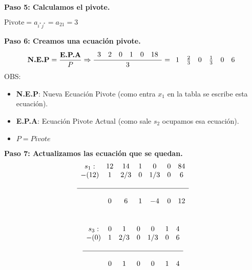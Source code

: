 \documentclass{templateNote}
\begin{document}
\textbf{Paso 5: Calculamos el pivote.}
\begin{center}
    $\text{Pivote} = a_{i^*j^*} = a_{21} = 3$
\end{center}

\textbf{Paso 6: Creamos una ecuación pivote.}
\begin{equation*}
    \textbf{N.E.P} = \frac{\textbf{E.P.A}}{P} \\
    \Rightarrow \frac{\begin{array}{cccccc} 3 & 2 & 0 & 1 & 0 & 18\end{array}}{3} = \begin{array}{cccccc} 1 & \frac{2}{3} & 0 & \frac{1}{3} & 0 & 6\end{array}
\end{equation*}
OBS:
\begin{itemize}
    \item \textbf{N.E.P}: Nueva Ecuación Pivote (como entra $x_1$ en la tabla se escribe esta ecuación).
    \item \textbf{E.P.A}: Ecuación Pivote Actual (como sale $s_2$ ocupamos esa ecuación).
    \item $P = Pivote$
\end{itemize}

\textbf{Paso 7: Actualizamos las ecuación que se quedan.}
\begin{equation*}
    \begin{array}{ccccccc}
        s_1: & 12 & 14 & 1 & 0 & 0 & 84 \\
        -(12) & 1 & 2/3 & 0 & 1/3 & 0 & 6 \\
        \\ \hline \\
        & 0 & 6 & 1 & -4 & 0 & 12 
    \end{array}
\end{equation*}
\\
\begin{equation*}
    \begin{array}{ccccccc}
        s_3: & 0 & 1 & 0 & 0 & 1 & 4 \\
        -(0) & 1 & 2/3 & 0 & 1/3 & 0 & 6 \\
        \\ \hline \\
        & 0 & 1 & 0 & 0 & 1 & 4 
    \end{array}
\end{equation*}
\end{document}
